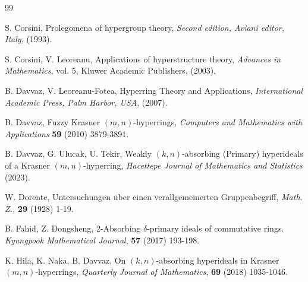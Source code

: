 \documentclass[preprint,review,10pt]{amsart}
\theoremstyle{definition}
\theoremstyle{remark}
\numberwithin{equation}{section}
\begin{document}
\begin{thebibliography}{99}

S. Corsini, Prolegomena of hypergroup theory, {\it Second edition, Aviani editor, Italy, } (1993). 

S. Corsini, V. Leoreanu, Applications of hyperstructure theory, {\it Advances in Mathematics}, vol. 5, Kluwer Academic Publishers, (2003). 


B. Davvaz, V. Leoreanu-Fotea, Hyperring Theory and Applications, {\it International Academic Press, Palm Harbor, USA}, (2007).



B. Davvaz, Fuzzy Krasner $(m,n)$-hyperrings, {\it Computers and Mathematics with Applications} {\bf 59} (2010) 3879-3891.

B. Davvaz, G. Ulucak, U. Tekir, Weakly $(k,n)$-absorbing (Primary) hyperideals  of a Krasner $(m,n)$-hyperring, {\it Hacettepe Journal of Mathematics and Statistics} (2023).



W. Dorente, Untersuchungen über einen verallgemeinerten Gruppenbegriff, {\it Math. Z.,} {\bf 29} (1928) 1-19. 

B. Fahid, Z. Dongsheng, 2-Absorbing $\delta$-primary ideals of commutative rings. {\it Kyungpook Mathematical Journal}, {\bf 57}
(2017) 193-198. 




K. Hila, K. Naka,  B. Davvaz,  On $(k,n)$-absorbing
hyperideals in Krasner $(m,n)$-hyperrings, {\it Quarterly Journal of
Mathematics}, {\bf 69}
(2018) 1035-1046.




\end{thebibliography}
\end{document}
